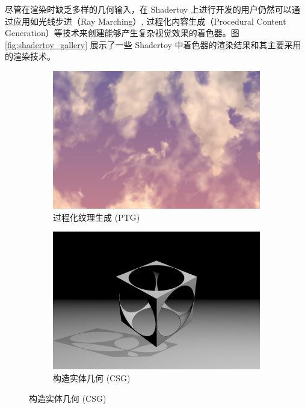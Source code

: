 尽管在渲染时缺乏多样的几何输入，在 Shadertoy 上进行开发的用户仍然可以通过应用如光线步进（Ray Marching）\cite{Hart1996}, 过程化内容生成（Procedural Content Generation）等技术来创建能够产生复杂视觉效果的着色器。图 \ref{fig:shadertoy_gallery} 展示了一些 Shadertoy 中着色器的渲染结果和其主要采用的渲染技术。

\begin{figure}[htbp]
    \centering
    \begin{minipage}[b]{\textwidth}
        \begin{subfigure}[b]{0.48\textwidth}
            \includegraphics[width=\textwidth]{figures/shadertoy_cloud.png}
            \caption{过程化纹理生成 (PTG)}
            \label{fig:sub_textgen}
        \end{subfigure}
        \hfill %
        \begin{subfigure}[b]{0.48\textwidth}
            \includegraphics[width=\textwidth]{figures/shadertoy_csg.png}
            \caption{构造实体几何 (CSG)}
            \label{fig:sub_csg}
        \end{subfigure}
    \end{minipage}
    

\end{figure}
